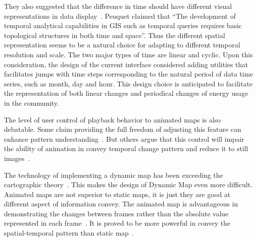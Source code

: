 \documentclass[hidelinks,12pt]{article}
\newcommand{\grey}[1]{\textcolor{black!30}{#1}}
\begin{document}
They also suggested that the difference in time should have different
visual representations in data display~\cite{Harrower2008}. Peuquet
claimed that ``The development of temporal analytical capabilities in
GIS such as temporal queries requires basic topological structures in
both time and space''. Thus the different spatial representation seems
to be a natural choice for adapting to different temporal resolution
and scale. The two major types of time are linear and cyclic. Upon
this consideration, the design of the current interface considered
adding utilities that facilitates jumps with time steps corresponding
to the natural period of data time series, such as month, day and
hour. This design choice is anticipated to facilitate the
representation of both linear changes and periodical changes of energy
usage in the community.

The level of user control of playback behavior to animated maps is
also debatable. Some claim providing the full freedom of adjusting
this feature can enhance pattern understanding~\cite{Nelson1998}. But
others argue that this control will impair the ability of animation in
convey temporal change pattern and reduce it to still
images~\cite{Lowe2004}.

The technology of implementing a dynamic map has been exceeding the
cartographic theory~\cite{Harrower2008}. This makes the design of
Dynamic Map even more difficult. Animated maps are not superior to
static maps, it is just they are good at different aspect of
information convey. The animated map is advantageous in demonstrating
the changes between frames rather than the absolute value represented
in each frame~\cite{Dorling1992}. It is proved to be more powerful in
convey the spatial-temporal pattern than static
map~\cite{McEachern1998}.

\begin{comment}
``Data Visualization with Spacetime Maps'', Richard L. Brownrigg, 2005
(read further later on)

\grey{To be continued later:
\begin{enumerate}[label*=\arabic*.]
\item ``Geographic Visualization: Designing Manipulable Maps for
    Exploring Temporally Varying Georeferenced Statistics'', MacEachren et al.\
\item ``Strategies for the Visualization of Geographic Time-Series
    Data'', Mark Monmonier, 2011
\item ``Evaluation of Methods for Classifying Epidemiological Data
    on Choropleth Maps in Series'', Brewer and Pickle, 2002
\end{enumerate}}
\end{comment}
\end{document}
